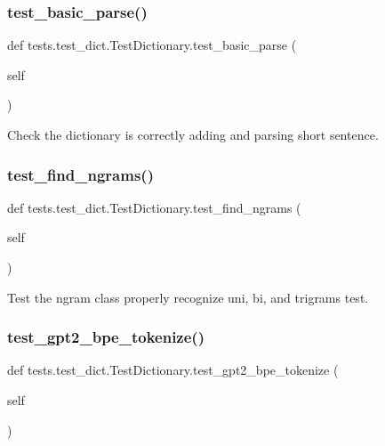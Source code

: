 \subsubsection{\texorpdfstring{test\+\_\+basic\+\_\+parse()}{test\_basic\_parse()}}
{\footnotesize\ttfamily def tests.\+test\+\_\+dict.\+Test\+Dictionary.\+test\+\_\+basic\+\_\+parse (\begin{DoxyParamCaption}\item[{}]{self }\end{DoxyParamCaption})}

\begin{DoxyVerb}Check the dictionary is correctly adding and parsing short sentence.
\end{DoxyVerb}
 \mbox{\label{classtests_1_1test__dict_1_1TestDictionary_ae017e72c578005310906979e15c51fe4}} 
\subsubsection{\texorpdfstring{test\+\_\+find\+\_\+ngrams()}{test\_find\_ngrams()}}
{\footnotesize\ttfamily def tests.\+test\+\_\+dict.\+Test\+Dictionary.\+test\+\_\+find\+\_\+ngrams (\begin{DoxyParamCaption}\item[{}]{self }\end{DoxyParamCaption})}

\begin{DoxyVerb}Test the ngram class properly recognize uni, bi, and trigrams test.
\end{DoxyVerb}
 \mbox{\label{classtests_1_1test__dict_1_1TestDictionary_a9109b6c1bf1f0e7adfdd3fc4dc1ead74}} 
\subsubsection{\texorpdfstring{test\+\_\+gpt2\+\_\+bpe\+\_\+tokenize()}{test\_gpt2\_bpe\_tokenize()}}
{\footnotesize\ttfamily def tests.\+test\+\_\+dict.\+Test\+Dictionary.\+test\+\_\+gpt2\+\_\+bpe\+\_\+tokenize (\begin{DoxyParamCaption}\item[{}]{self }\end{DoxyParamCaption})}

